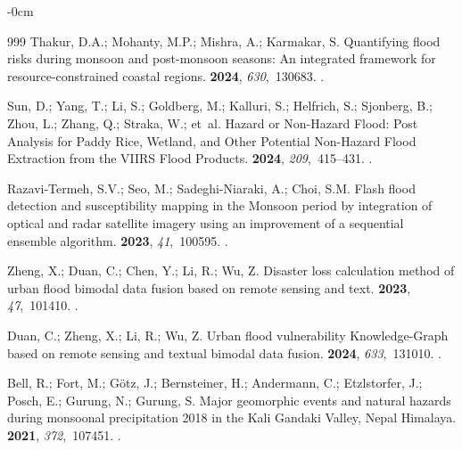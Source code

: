 \documentclass[water,article,accept,pdftex,oneauhor]{Definitions/mdpi}
\begin{document}
{{{\begin{adjustwidth}{-\extralength}{0cm}
\begin{thebibliography}{999}
Thakur, D.A.; Mohanty, M.P.; Mishra, A.; Karmakar, S.
\newblock Quantifying flood risks during monsoon and post-monsoon seasons: An
  integrated framework for resource-constrained coastal regions.
 {\bf 2024}, {\em 630},~130683.
.

Sun, D.; Yang, T.; Li, S.; Goldberg, M.; Kalluri, S.; Helfrich, S.; Sjonberg,
  B.; Zhou, L.; Zhang, Q.; Straka, W.;  et~al.
\newblock Hazard or Non-Hazard Flood: Post Analysis for Paddy Rice, Wetland,
  and Other Potential Non-Hazard Flood Extraction from the VIIRS Flood
  Products.
 {\bf 2024}, {\em
  209},~415--431.
.

Razavi-Termeh, S.V.; Seo, M.; Sadeghi-Niaraki, A.; Choi, S.M.
\newblock Flash flood detection and susceptibility mapping in the Monsoon
  period by integration of optical and radar satellite imagery using an
  improvement of a sequential ensemble algorithm.
 {\bf 2023}, {\em 41},~100595.
.

Zheng, X.; Duan, C.; Chen, Y.; Li, R.; Wu, Z.
\newblock Disaster loss calculation method of urban flood bimodal data fusion
  based on remote sensing and text.
 {\bf 2023}, {\em 47},~101410.
.

Duan, C.; Zheng, X.; Li, R.; Wu, Z.
\newblock Urban flood vulnerability Knowledge-Graph based on remote sensing and
  textual bimodal data fusion.
 {\bf 2024}, {\em 633},~131010.
.

Bell, R.; Fort, M.; Götz, J.; Bernsteiner, H.; Andermann, C.; Etzlstorfer, J.;
  Posch, E.; Gurung, N.; Gurung, S.
\newblock Major geomorphic events and natural hazards during monsoonal
  precipitation 2018 in the Kali Gandaki Valley, Nepal Himalaya.
 {\bf 2021}, {\em 372},~107451.
.


\end{thebibliography}
\end{adjustwidth}}}}
\end{document}
